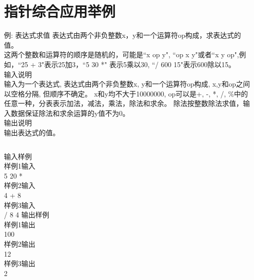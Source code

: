 
\section{指针综合应用举例}

\begin{frame}{例: 表达式求值}
表达式由两个非负整数x，y和一个运算符op构成，求表达式的值。\\
这两个整数和运算符的顺序是随机的，可能是``x op y", ``op x y"或者``x y op",例如，``25 + 3"表示25加3，``5 30 *" 表示5乘以30, ``/ 600 15"表示600除以15。\\
输入说明\\	
输入为一个表达式, 表达式由两个非负整数x, y和一个运算符op构成, x,y和op之间以空格分隔, 但顺序不确定。
x和y均不大于10000000, op可以是+, -, *, /, \%中的任意一种，分表表示加法，减法，乘法，除法和求余。
除法按整数除法求值，输入数据保证除法和求余运算的y值不为0。\\
输出说明\\	
输出表达式的值。\\
\medskip
\begin{columns}
	输入样例\\	
	样例1输入\\
	5 20 *\\
	样例2输入\\
	4 + 8\\
	样例3输入\\
	/ 8 4
	输出样例\\	
	样例1输出\\
	100\\
	样例2输出\\
	12\\
	样例3输出\\
	2
\end{columns}
\medskip
\end{frame}

